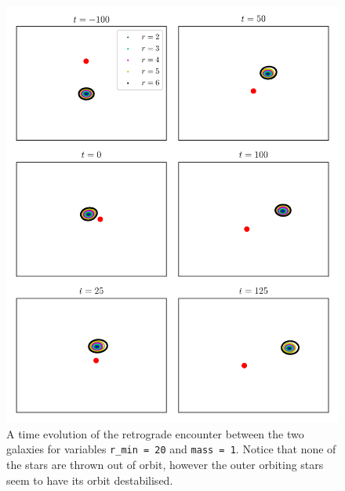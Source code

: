 \documentclass[twoside,twocolumn]{article}
\begin{document}
\begin{figure}
    \centering
    \includegraphics[width=\linewidth]{images/clockwise_positions.png}
    \caption{A time evolution of the retrograde encounter between the two galaxies for variables \texttt{r\_min = 20} and \texttt{mass = 1}. Notice that none of the stars are thrown out of orbit, however the outer orbiting stars seem to have its orbit destabilised.}
    \label{figure:retrograde}
\end{figure}
\end{document}
